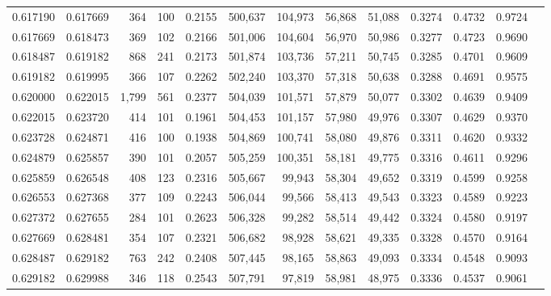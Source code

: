 \begin{tabular}{rrrrrrrrrrrrr}
0.617190 & 0.617669 &   364 & 100 &                                     0.2155 & 500,637 & 104,973 &  56,868 &  51,088 & 0.3274 & 0.4732 & 0.9724 \\
0.617669 & 0.618473 &   369 & 102 &                                     0.2166 & 501,006 & 104,604 &  56,970 &  50,986 & 0.3277 & 0.4723 & 0.9690 \\
0.618487 & 0.619182 &   868 & 241 &                                     0.2173 & 501,874 & 103,736 &  57,211 &  50,745 & 0.3285 & 0.4701 & 0.9609 \\
0.619182 & 0.619995 &   366 & 107 &                                     0.2262 & 502,240 & 103,370 &  57,318 &  50,638 & 0.3288 & 0.4691 & 0.9575 \\
0.620000 & 0.622015 & 1,799 & 561 &                                     0.2377 & 504,039 & 101,571 &  57,879 &  50,077 & 0.3302 & 0.4639 & 0.9409 \\
0.622015 & 0.623720 &   414 & 101 &                                     0.1961 & 504,453 & 101,157 &  57,980 &  49,976 & 0.3307 & 0.4629 & 0.9370 \\
0.623728 & 0.624871 &   416 & 100 &                                     0.1938 & 504,869 & 100,741 &  58,080 &  49,876 & 0.3311 & 0.4620 & 0.9332 \\
0.624879 & 0.625857 &   390 & 101 &                                     0.2057 & 505,259 & 100,351 &  58,181 &  49,775 & 0.3316 & 0.4611 & 0.9296 \\
0.625859 & 0.626548 &   408 & 123 &                                     0.2316 & 505,667 &  99,943 &  58,304 &  49,652 & 0.3319 & 0.4599 & 0.9258 \\
0.626553 & 0.627368 &   377 & 109 &                                     0.2243 & 506,044 &  99,566 &  58,413 &  49,543 & 0.3323 & 0.4589 & 0.9223 \\
0.627372 & 0.627655 &   284 & 101 &                                     0.2623 & 506,328 &  99,282 &  58,514 &  49,442 & 0.3324 & 0.4580 & 0.9197 \\
0.627669 & 0.628481 &   354 & 107 &                                     0.2321 & 506,682 &  98,928 &  58,621 &  49,335 & 0.3328 & 0.4570 & 0.9164 \\
0.628487 & 0.629182 &   763 & 242 &                                     0.2408 & 507,445 &  98,165 &  58,863 &  49,093 & 0.3334 & 0.4548 & 0.9093 \\
0.629182 & 0.629988 &   346 & 118 &                                     0.2543 & 507,791 &  97,819 &  58,981 &  48,975 & 0.3336 & 0.4537 & 0.9061 \\

\end{tabular}
